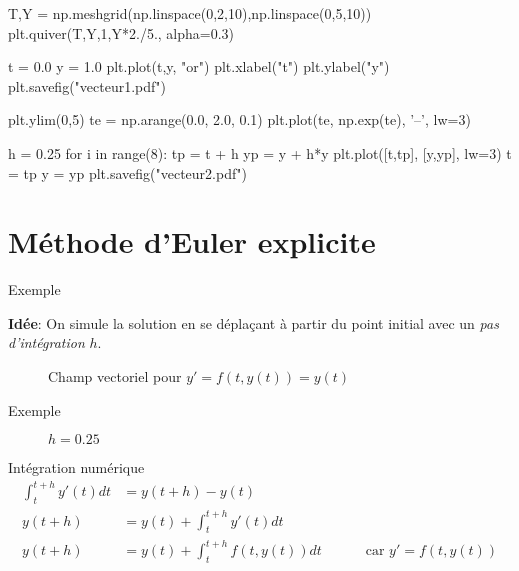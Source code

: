 \documentclass{beamer}
\begin{document}
\begin{pycode}
    T,Y = np.meshgrid(np.linspace(0,2,10),np.linspace(0,5,10))
    plt.quiver(T,Y,1,Y*2./5., alpha=0.3)

    t = 0.0
    y = 1.0
    plt.plot(t,y, "or")
    plt.xlabel("t")
    plt.ylabel("y")
    plt.savefig("vecteur1.pdf")

    plt.ylim(0,5)
    te = np.arange(0.0, 2.0, 0.1)
    plt.plot(te, np.exp(te), '--', lw=3)

    h = 0.25
    for i in range(8):
        tp = t + h
        yp = y + h*y
        plt.plot([t,tp], [y,yp], lw=3)
        t = tp
        y = yp
    plt.savefig("vecteur2.pdf")
\end{pycode}

\section{Méthode d'Euler explicite}

\begin{frame}{Exemple}

    \textbf{Idée}: On simule la solution en se déplaçant à partir du point initial avec un \emph{pas d'intégration} $h$.

    \begin{figure}
        \caption{Champ vectoriel pour $y'= f(t,y(t)) = y(t)$}
    \end{figure}
\end{frame}

\begin{frame}{Exemple}
    \begin{figure}
        \caption{$h=0.25$}
    \end{figure}
\end{frame}


\begin{frame}{Intégration numérique}
    \begin{align*}
        \int_t^{t+h} y'(t) dt & = y(t+h) - y(t)                    &                                     \\
        y(t+h)                & = y(t) + \int_t^{t+h} y'(t) dt     &                                     \\
        y(t+h)                & = y(t) + \int_t^{t+h} f(t,y(t)) dt & \qquad \text{ car } y' = f(t, y(t)) \\
    \end{align*}
\end{frame}
\end{document}
